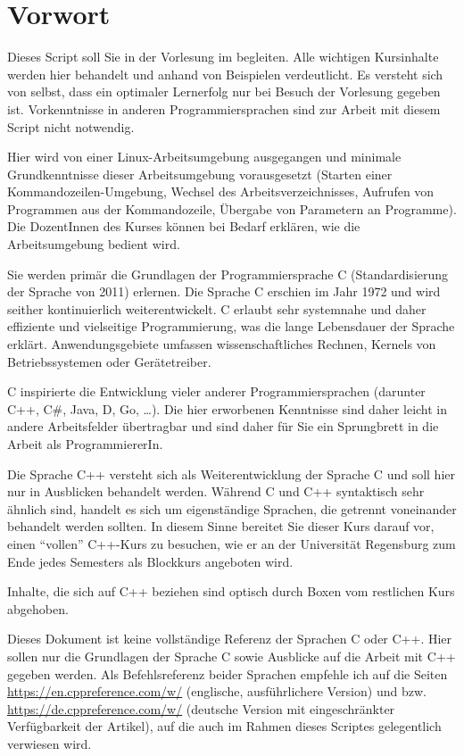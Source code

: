\section*{Vorwort}
Dieses Script soll Sie in der Vorlesung \emph{\myTitle} im \currentPeriod begleiten. Alle wichtigen Kursinhalte werden hier behandelt und anhand von Beispielen verdeutlicht. Es versteht sich von selbst, dass ein optimaler Lernerfolg nur bei Besuch der Vorlesung gegeben ist. Vorkenntnisse in anderen Programmiersprachen sind zur Arbeit mit diesem Script nicht notwendig.

Hier wird von einer Linux-Arbeits\-umgebung ausgegangen und minimale Grundkenntnisse dieser Arbeits\-umgebung vorausgesetzt (Starten einer Kommandozeilen-Umgebung, Wechsel des Arbeitsverzeichnisses, Aufrufen von Programmen aus der Kommandozeile, Übergabe von Parametern an Programme). Die DozentInnen des Kurses können bei Bedarf erklären, wie die Arbeitsumgebung bedient wird.

Sie werden primär die Grundlagen der Programmiersprache C (Standardisierung der Sprache von 2011) erlernen. Die Sprache C erschien im Jahr 1972 und wird seither kontinuierlich weiterentwickelt. C erlaubt sehr systemnahe und daher effiziente und vielseitige Programmierung, was die lange Lebensdauer der Sprache erklärt. Anwendungsgebiete umfassen \ua wissenschaftliches Rechnen, Kernels von Betriebssystemen oder Gerätetreiber.

C inspirierte die Entwicklung vieler anderer Programmiersprachen (darunter C++, C\#, Java, D, Go, \ldots). Die hier erworbenen Kenntnisse sind daher leicht in andere Arbeitsfelder übertragbar und sind daher für Sie ein Sprungbrett in die Arbeit als ProgrammiererIn.

Die Sprache C++ versteht sich als Weiterentwicklung der Sprache C und soll hier nur in Ausblicken behandelt werden. Während C und C++ syntaktisch sehr ähnlich sind, handelt es sich um eigenständige Sprachen, die getrennt voneinander behandelt werden sollten. In diesem Sinne bereitet Sie dieser Kurs darauf vor, einen \enquote{vollen} C++-Kurs zu besuchen, wie er an der Universität Regensburg zum Ende jedes Semesters als Blockkurs angeboten wird.

\begin{plusbox}
Inhalte, die sich auf C++ beziehen sind optisch durch Boxen vom restlichen Kurs abgehoben.
\end{plusbox}

Dieses Dokument ist keine vollständige Referenz der Sprachen C oder C++. Hier sollen nur die Grundlagen der Sprache C sowie Ausblicke auf die Arbeit mit C++ gegeben werden. Als Befehlsreferenz beider Sprachen empfehle ich auf die Seiten \url{https://en.cppreference.com/w/} (englische, ausführlichere Version) und bzw. \url{https://de.cppreference.com/w/} (deutsche Version mit eingeschränkter Verfügbarkeit der Artikel), auf die auch im Rahmen dieses Scriptes gelegentlich verwiesen wird.

